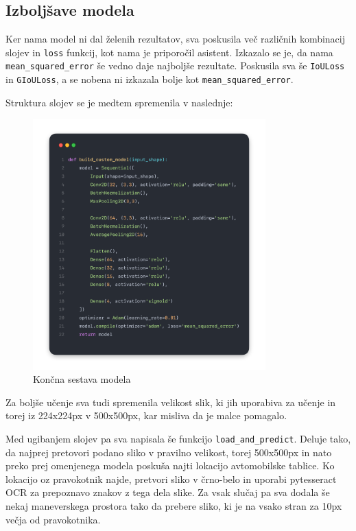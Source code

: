 \documentclass[a4paper,12pt]{article}
\begin{document}
\subsection*{Izboljšave modela}
Ker nama model ni dal želenih rezultatov, sva poskusila več različnih kombinacij slojev in \texttt{loss} funkcij, kot nama je priporočil asistent. Izkazalo se je, da nama \texttt{mean\_squared\_error} še vedno daje najboljše rezultate. Poskusila sva še \texttt{IoULoss} in \texttt{GIoULoss}, a se nobena ni izkazala bolje kot \texttt{mean\_squared\_error}.

Struktura slojev se je medtem spremenila v naslednje:

\begin{figure}[H]
    \centering
    \includegraphics[width=0.8\textwidth]{img/build_custom_model2.png}
    \caption{Končna sestava modela}
\end{figure}

Za boljše učenje sva tudi spremenila velikost slik, ki jih uporabiva za učenje in torej iz 224x224px v 500x500px, kar misliva da je malce pomagalo.

Med ugibanjem slojev pa sva napisala še funkcijo \texttt{load\_and\_predict}. Deluje tako, da najprej pretovori podano sliko v pravilno velikost, torej 500x500px in nato preko prej omenjenega modela poskuša najti lokacijo avtomobilske tablice. Ko lokacijo oz pravokotnik najde, pretvori sliko v črno-belo in uporabi pytesseract OCR za prepoznavo znakov z tega dela slike. Za vsak slučaj pa sva dodala še nekaj maneverskega prostora tako da prebere sliko, ki je na vsako stran za 10px večja od pravokotnika.
\end{document}
